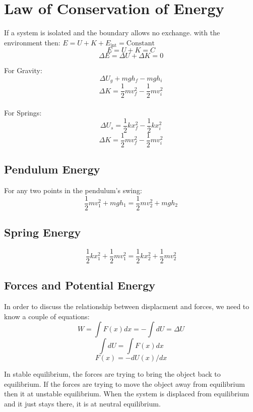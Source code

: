\section{Law of Conservation of Energy}
If a system is isolated and the boundary allows no exchange. with the environment then: $E=U+K+E_{\text{int}}=\text{Constant}$
\[E=U+K=C\]
\[\Delta E= \Delta U + \Delta K =0\]

\begin{center}
For Gravity:
\[\Delta U_g + mgh_f-mgh_i\]
\[\Delta K =\frac{1}{2}mv_f^2-\frac{1}{2}mv_i^2\]
\\
For Springs:
\[\Delta U_s = \frac{1}{2}kx_f^2-\frac{1}{2}kx^2_i\]
\[\Delta K = \frac{1}{2}mv_f^2-\frac{1}{2}mv_i^2\]
\end{center}

\subsection{Pendulum Energy}
For any two points in the pendulum's swing:
\[\frac{1}{2}mv_1^2+mgh_1=\frac{1}{2}mv^2_2+mgh_2\]

\subsection{Spring Energy}
\[\frac{1}{2}kx_1^2+\frac{1}{2}mv_1^2=\frac{1}{2}kx_2^2+\frac{1}{2}mv_2^2\]

\subsection{Forces and Potential Energy}
In order to discuss the relationship between displacment and forces, we need to know a couple of equations:
\[W=\int F(x)dx=-\int dU=\Delta U\]
\[\int dU= \int F(x)dx\]
\[F(x)=-dU(x)/dx\]

In stable equilibrium, the forces are trying to bring the object back to equilibrium. If the forces are trying to move the object away from equilibrium then it at unstable equilibrium. When the system is displaced from equilibrium and it just stays there, it is at neutral equilibrium. 
